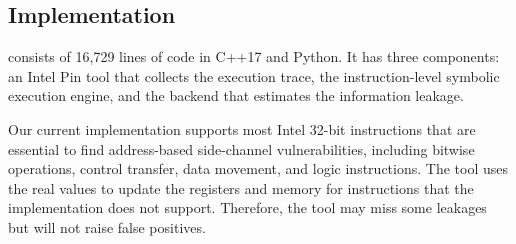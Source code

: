\subsection{Implementation}
\tool{} consists of 16,729 lines of code in C++17 and Python. It has three
components: an Intel Pin tool that collects the execution trace, the
instruction-level symbolic execution engine, and the backend that estimates
the information leakage. 

Our current implementation supports most Intel 32-bit instructions that are essential to find address-based side-channel
vulnerabilities, including bitwise operations, control transfer, data movement, and logic
instructions. The tool uses the real values to update the registers and memory for instructions that the implementation does not support. 
Therefore, the tool may miss some leakages but will not raise false positives. 
